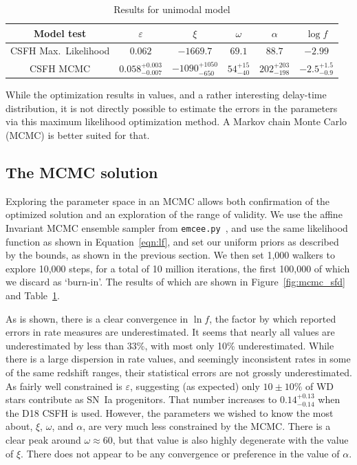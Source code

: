 \documentclass[apj]{aastex}
\begin{document}
\begin{table}
    \centering
    \caption{Results for unimodal model}
    \label{tab:results}
    \begin{tabular}{cccccc}
        \hline
                Model test & $\varepsilon$ & $\xi$ & $\omega$ & $\alpha$ & $\log f$ \\ 
                \hline
		CSFH Max.~Likelihood &$0.062$&$-1669.7$& $69.1$& $88.7$& $-2.99$\\
                CSFH MCMC & $0.058^{+0.003}_{-0.007}$ & $-1090^{+1050}_{-650}$ &$54^{+15}_{-40}$& $202^{+203}_{-198}$&  $-2.5^{+1.5}_{-0.9}$\\
                \hline
    \end{tabular}
\end{table}

While the optimization results in values, and a rather interesting delay-time distribution, it is not directly possible to estimate the errors in the parameters via this maximum likelihood optimization method. A Markov chain Monte Carlo (MCMC) is better suited for that.

\subsection{The MCMC solution}
Exploring the parameter space in an MCMC allows both confirmation of the optimized solution and an exploration of the range of validity. We use the affine Invariant MCMC ensemble sampler from {\tt emcee.py}~\citep{Foreman-Mackey:2013pd}, and use the same likelihood function as shown in Equation~\ref{eqn:lf}, and set our uniform priors as described by the bounds, as shown in the previous section. We then set 1,000 walkers to explore 10,000 steps, for a total of 10 million iterations, the first 100,000 of which we discard as `burn-in'. The results of which are shown in Figure~\ref{fig:mcmc_sfd} and Table~\ref{tab:results}.

As is shown, there is a clear convergence in $\ln f$, the factor by which reported errors in rate measures are underestimated. It seems that nearly all values are underestimated by less than 33\%, with most only 10\% underestimated. While there is a large dispersion in rate values, and seemingly inconsistent rates in some of the same redshift ranges, their statistical errors are not grossly underestimated. As fairly well constrained is $\varepsilon$, suggesting (as expected) only $10\pm10\%$ of WD stars contribute as SN~Ia progenitors. That number increases to  $0.14^{+0.13}_{-0.14}$ when the D18 CSFH is used. However, the parameters we wished to know the most about,  $\xi$, $\omega$, and $\alpha$, are very much less constrained by the MCMC. There is a clear peak around $\omega\approx60$, but that value is also highly degenerate with the value of $\xi$.  There does not appear to be any convergence or preference in the value of $\alpha$.
\end{document}
